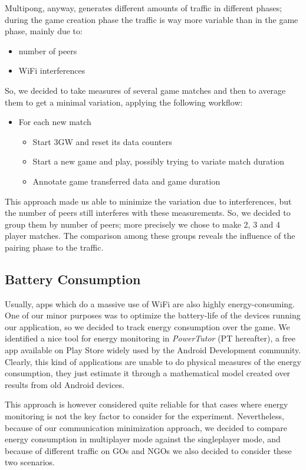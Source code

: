 Multipong, anyway, generates different amounts of traffic in different phases; during the game creation phase the traffic is way more variable than in the game phase, mainly due to:

\begin{itemize}
\item number of peers
\item WiFi interferences
\end{itemize}

So, we decided to take measures of several game matches and then to average them to get a minimal variation, applying the following workflow:

\begin{itemize}
\item For each new match
	\begin{itemize}
	\item Start 3GW and reset its data counters
	\item Start a new game and play, possibly trying to variate match duration
	\item Annotate game transferred data and game duration
	\end{itemize}
\end{itemize}

This approach made us able to minimize the variation due to interferences, but the number of peers still interferes with these measurements. So, we decided to group them by number of peers; more precisely we chose to make 2, 3 and 4 player matches. The comparison among these groups reveals the influence of the pairing phase to the traffic.

\subsection{Battery Consumption}

Usually, apps which do a massive use of WiFi are also highly energy-consuming. One of our minor purposes was to optimize the battery-life of the devices running our application, so we decided to track energy consumption over the game. We identified a nice tool for energy monitoring in \textit{PowerTutor} (PT hereafter), a free app available on Play Store widely used by the Android Development community. Clearly, this kind of applications are unable to do physical measures of the energy consumption, they just estimate it through a mathematical model created over results from old Android devices. 

This approach is however considered quite reliable for that cases where energy monitoring is not the key factor to consider for the experiment. Nevertheless, because of our communication minimization approach, we decided to compare energy consumption in multiplayer mode against the singleplayer mode, and because of different traffic on GOs and NGOs we also decided to consider these two scenarios.
